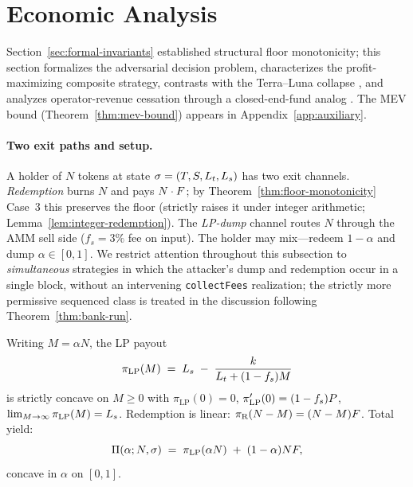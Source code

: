 \section{Economic Analysis}
\label{sec:economic-analysis}

Section~\ref{sec:formal-invariants} established structural floor monotonicity; this section formalizes the adversarial decision problem, characterizes the profit-maximizing composite strategy, contrasts with the Terra--Luna collapse \citep{LiuMakarovSchoar2023}, and analyzes operator-revenue cessation through a closed-end-fund analog \citep{CherkesSagiStanton2009}. The MEV bound (Theorem~\ref{thm:mev-bound}) appears in Appendix~\ref{app:auxiliary}.

\paragraph{Two exit paths and setup.} A holder of $N$ tokens at state $\sigma = (T, S, L_t, L_s)$ has two exit channels. \emph{Redemption} burns $N$ and pays $N \cdot F$; by Theorem~\ref{thm:floor-monotonicity} Case~3 this preserves the floor (strictly raises it under integer arithmetic; Lemma~\ref{lem:integer-redemption}). The \emph{LP-dump} channel routes $N$ through the AMM sell side ($f_s = 3\%$ fee on input). The holder may mix---redeem $1-\alpha$ and dump $\alpha \in [0,1]$. We restrict attention throughout this subsection to \emph{simultaneous} strategies in which the attacker's dump and redemption occur in a single block, without an intervening \texttt{collectFees} realization; the strictly more permissive sequenced class is treated in the discussion following Theorem~\ref{thm:bank-run}.

Writing $M = \alpha N$, the LP payout
\begin{equation}
\pi_{\text{LP}}(M) \;=\; L_s \;-\; \frac{k}{L_t + (1 - f_s) M}
\label{eq:lp-payout}
\end{equation}
is strictly concave on $M \geq 0$ with $\pi_{\text{LP}}(0) = 0$, $\pi_{\text{LP}}'(0) = (1 - f_s) P$, $\lim_{M \to \infty} \pi_{\text{LP}}(M) = L_s$. Redemption is linear: $\pi_{\text{R}}(N - M) = (N - M) F$. Total yield:
\begin{equation}
\Pi(\alpha; N, \sigma) \;=\; \pi_{\text{LP}}(\alpha N) \;+\; (1 - \alpha) N F,
\label{eq:total-yield}
\end{equation}
concave in $\alpha$ on $[0, 1]$.

